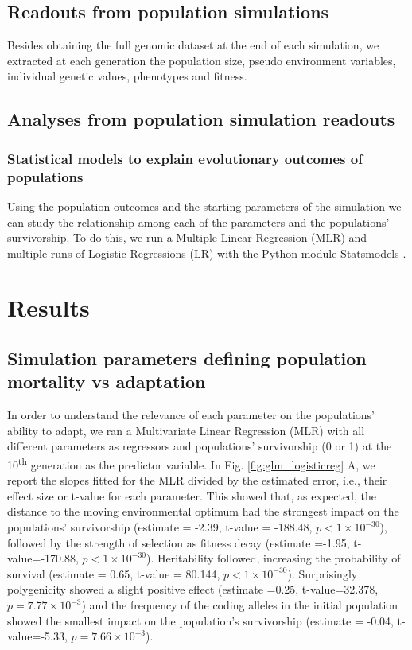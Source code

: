 \documentclass{article}
\begin{document}
\subsection{Readouts from population simulations}
Besides obtaining the full genomic dataset at the end of each simulation,  we extracted at each generation the population size, pseudo environment variables, individual genetic values, phenotypes and fitness. 

\subsection{Analyses from population simulation readouts}

\subsubsection{Statistical models to explain evolutionary outcomes of populations}

Using the population outcomes and the starting parameters of the simulation we can study the relationship among each of the parameters and the populations' survivorship. To do this, we run a Multiple Linear Regression (MLR) and multiple runs of Logistic Regressions (LR) with the Python module Statsmodels \citep{Seabold2010-ec}. 

\section{Results}

\subsection{Simulation parameters defining population mortality vs adaptation}
In order to understand the relevance of each parameter on the populations' ability to adapt, we ran a Multivariate Linear Regression (MLR) with all different parameters as regressors and populations' survivorship (0 or 1) at the 10\textsuperscript{th} generation as the predictor variable. In Fig. \ref{fig:glm_logisticreg} A, we report the slopes fitted for the MLR divided by the estimated error, i.e., their effect size or t-value for each parameter. This showed that, as expected, the distance to the moving environmental optimum had the strongest impact on the populations' survivorship (estimate = -2.39, t-value = -188.48, $p<1 \times 10^{-30}$), followed by the strength of selection as fitness decay (estimate =-1.95, t-value=-170.88,  $p<1 \times 10^{-30}$). Heritability followed, increasing the probability of survival (estimate = 0.65, t-value = 80.144, $p<1 \times 10^{-30}$). Surprisingly polygenicity showed a slight positive effect  (estimate =0.25, t-value=32.378,  $p=7.77 \times 10^{-3}$) and the frequency of the coding alleles in the initial population showed the smallest impact on the population's survivorship (estimate = -0.04, t-value=-5.33,  $p=7.66 \times 10^{-3}$).
\end{document}

